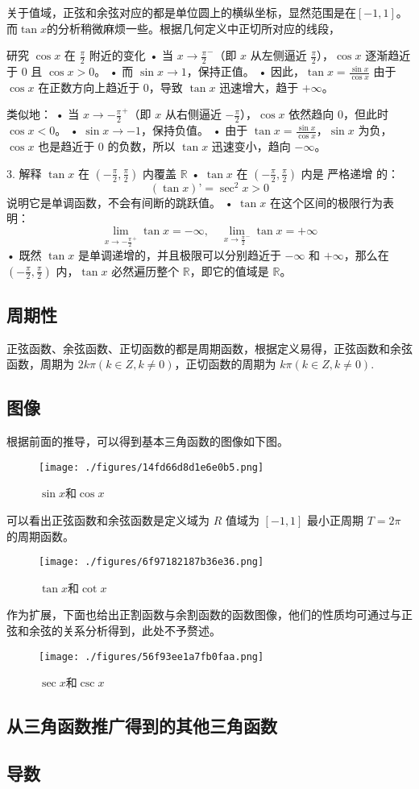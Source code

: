 关于值域，正弦和余弦对应的都是单位圆上的横纵坐标，显然范围是在$[-1,1]$。而$\tan x$的分析稍微麻烦一些。根据几何定义中正切所对应的线段，

研究 $\cos x$ 在 $\frac{\pi}{2}$ 附近的变化
	•	当 $x \to \frac{\pi}{2}^-$（即 $x$ 从左侧逼近 $\frac{\pi}{2}$），$\cos x$ 逐渐趋近于 $0$ 且 $\cos x > 0$。
	•	而 $\sin x \to 1$，保持正值。
	•	因此，$\tan x = \frac{\sin x}{\cos x}$ 由于 $\cos x$ 在正数方向上趋近于 $0$，导致 $\tan x$ 迅速增大，趋于 $+\infty$。

类似地：
	•	当 $x \to -\frac{\pi}{2}^+$（即 $x$ 从右侧逼近 $-\frac{\pi}{2}$），$\cos x$ 依然趋向 $0$，但此时 $\cos x < 0$。
	•	$\sin x \to -1$，保持负值。
	•	由于 $\tan x = \frac{\sin x}{\cos x}$，$\sin x$ 为负，$\cos x$ 也是趋近于 $0$ 的负数，所以 $\tan x$ 迅速变小，趋向 $-\infty$。

3. 解释 $\tan x$ 在 $(-\frac{\pi}{2}, \frac{\pi}{2})$ 内覆盖 $\mathbb{R}$
	•	$\tan x$ 在 $(-\frac{\pi}{2}, \frac{\pi}{2})$ 内是 严格递增 的：
$$
(\tan x)’ = \sec^2 x > 0
$$
说明它是单调函数，不会有间断的跳跃值。
	•	$\tan x$ 在这个区间的极限行为表明：
$$
\lim\limits_{x \to -\frac{\pi}{2}^+} \tan x = -\infty, \quad \lim\limits_{x \to \frac{\pi}{2}^-} \tan x = +\infty
$$
	•	既然 $\tan x$ 是单调递增的，并且极限可以分别趋近于 $-\infty$ 和 $+\infty$，那么在 $(-\frac{\pi}{2}, \frac{\pi}{2})$ 内，$\tan x$ 必然遍历整个 $\mathbb{R}$，即它的值域是 $\mathbb{R}$。

\subsection{周期性}

正弦函数、余弦函数、正切函数的都是周期函数，根据定义易得，正弦函数和余弦函数，周期为 $2k\pi(k\in Z,k\neq0)$，正切函数的周期为 $k\pi(k\in Z,k\neq0)$.


\subsection{图像}
根据前面的推导，可以得到基本三角函数的图像如下图。
\begin{figure}[ht]
\centering
\texttt{[image: ./figures/14fd66d8d1e6e0b5.png]}
\caption{$\sin x$和$\cos x$} \label{fig_HsTFFv_1}
\end{figure}
可以看出正弦函数和余弦函数是定义域为 $R$ 值域为 $[-1,1]$ 最小正周期 $T = 2\pi$ 的周期函数。

\begin{figure}[ht]
\centering
\texttt{[image: ./figures/6f97182187b36e36.png]}
\caption{$\tan x$和$\cot x$} \label{fig_HsTFFv_3}
\end{figure}

作为扩展，下面也给出正割函数与余割函数的函数图像，他们的性质均可通过与正弦和余弦的关系分析得到，此处不予赘述。

\begin{figure}[ht]
\centering
\texttt{[image: ./figures/56f93ee1a7fb0faa.png]}
\caption{$\sec x$和$\csc x$} \label{fig_HsTFFv_2}
\end{figure}

\subsection{从三角函数推广得到的其他三角函数}

\subsection{导数}